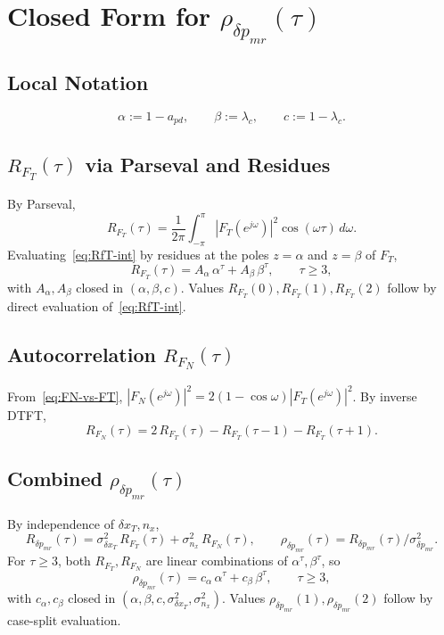 \documentclass[11pt,a4paper]{ctexart}
\newcommand{\lc}{\lambda_c}
\newcommand{\dxT}{\delta x_{T}}
\newcommand{\nx}{n_{x}}
\newcommand{\dpmr}{\delta p_{mr}}
\newcommand{\FT}{F_{T}}
\newcommand{\FN}{F_{N}}
\newcommand{\apd}{a_{pd}}
\newcommand{\Rdpmr}{R_{\dpmr}}
\newcommand{\rhodpmr}{\rho_{\dpmr}}
\newcommand{\RfT}{R_{\FT}}
\newcommand{\RfN}{R_{\FN}}
\begin{document}
\section{Closed Form for $\rhodpmr(\tau)$}
\label{sec:rho}

\subsection{Local Notation}
\begin{equation}
\alpha := 1-\apd,\qquad \beta := \lc,\qquad c := 1-\lc.
\label{eq:alpha-beta}
\end{equation}

\subsection{$\RfT(\tau)$ via Parseval and Residues}

By Parseval,
\begin{equation}
\RfT(\tau) = \frac{1}{2\pi}\!\!\int_{-\pi}^{\pi}\!\!|\FT(e^{j\omega})|^{2}\cos(\omega\tau)\,d\omega.
\label{eq:RfT-int}
\end{equation}
Evaluating~\eqref{eq:RfT-int} by residues at the poles $z=\alpha$ and $z=\beta$ of $\FT$,
\begin{equation}
\RfT(\tau) = A_{\alpha}\,\alpha^{\tau} + A_{\beta}\,\beta^{\tau},\qquad \tau\ge 3,
\label{eq:RfT-tail}
\end{equation}
with $A_{\alpha},A_{\beta}$ closed in $(\alpha,\beta,c)$. Values $\RfT(0),\RfT(1),\RfT(2)$ follow by direct evaluation of~\eqref{eq:RfT-int}.

\subsection{Autocorrelation $\RfN(\tau)$}

From~\eqref{eq:FN-vs-FT}, $|\FN(e^{j\omega})|^{2} = 2(1-\cos\omega)|\FT(e^{j\omega})|^{2}$. By inverse DTFT,
\begin{equation}
\RfN(\tau) = 2\,\RfT(\tau) - \RfT(\tau-1) - \RfT(\tau+1).
\label{eq:RfN-id}
\end{equation}

\subsection{Combined $\rhodpmr(\tau)$}

By independence of $\dxT,\nx$,
\begin{equation}
\Rdpmr(\tau) = \sigma^{2}_{\dxT}\,\RfT(\tau) + \sigma^{2}_{\nx}\,\RfN(\tau),
\qquad
\rhodpmr(\tau) = \Rdpmr(\tau)/\sigma^{2}_{\dpmr}.
\label{eq:rho-comb}
\end{equation}
For $\tau\ge 3$, both $\RfT,\RfN$ are linear combinations of $\alpha^{\tau},\beta^{\tau}$, so
\begin{equation}
\rhodpmr(\tau) = c_{\alpha}\,\alpha^{\tau} + c_{\beta}\,\beta^{\tau},\qquad \tau\ge 3,
\label{eq:rho-tail}
\end{equation}
with $c_{\alpha},c_{\beta}$ closed in $(\alpha,\beta,c,\sigma^{2}_{\dxT},\sigma^{2}_{\nx})$. Values $\rhodpmr(1),\rhodpmr(2)$ follow by case-split evaluation.
\end{document}
